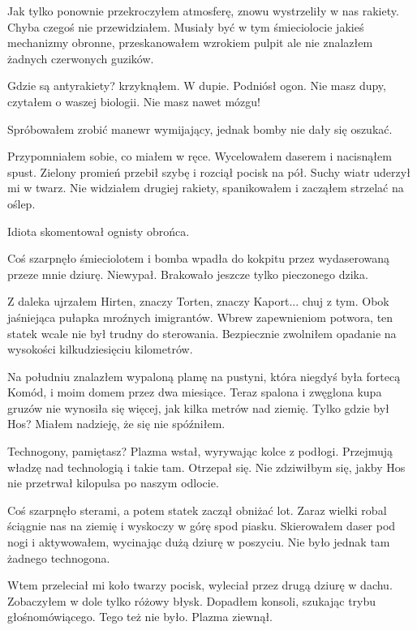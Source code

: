 Jak tylko ponownie przekroczyłem atmosferę, znowu wystrzeliły w nas rakiety.
Chyba czegoś nie przewidziałem.
Musiały być w tym śmieciolocie jakieś mechanizmy obronne, przeskanowałem wzrokiem pulpit ale nie znalazłem żadnych czerwonych guzików.
\begin{dialogue}
\ds{} Gdzie są antyrakiety? \dm{} krzyknąłem.
\ds{} W dupie. \dm{} Podniósł ogon.
\ds{} Nie masz dupy, czytałem o waszej biologii. Nie masz nawet mózgu!
\end{dialogue}
Spróbowałem zrobić manewr wymijający, jednak bomby nie dały się oszukać.

Przypomniałem sobie, co miałem w ręce.
Wycelowałem daserem i nacisnąłem spust.
Zielony promień przebił szybę i rozciął pocisk na pół.
Suchy wiatr uderzył mi w twarz.
Nie widziałem drugiej rakiety, spanikowałem i zacząłem strzelać na oślep.
\begin{dialogue}
\ds{} Idiota \dm{} skomentował ognisty obrońca.
\end{dialogue}

Coś szarpnęło śmieciolotem i bomba wpadła do kokpitu przez wydaserowaną przeze mnie dziurę. Niewypał.
Brakowało jeszcze tylko pieczonego dzika.

Z daleka ujrzałem Hirten, znaczy Torten, znaczy Kaport... chuj z tym.
Obok jaśniejąca pułapka mroźnych imigrantów.
Wbrew zapewnieniom potwora, ten statek wcale nie był trudny do sterowania.
Bezpiecznie zwolniłem opadanie na wysokości kilkudziesięciu kilometrów.

Na południu znalazłem wypaloną plamę na pustyni, która niegdyś była fortecą Komód, i moim domem przez dwa miesiące.
Teraz spalona i zwęglona kupa gruzów nie wynosiła się więcej, jak kilka metrów nad ziemię.
Tylko gdzie był Hos? Miałem nadzieję, że się nie spóźniłem.

\begin{dialogue}
\ds{} Technogony, pamiętasz? \dm{} Plazma wstał, wyrywając kolce z podłogi. \dm{} 
Przejmują władzę nad technologią i takie tam. \dm{} Otrzepał się. \dm{} Nie zdziwiłbym się, jakby Hos nie przetrwał kilopulsa po naszym odlocie.
\end{dialogue}
Coś szarpnęło sterami, a potem statek zaczął obniżać lot.
Zaraz wielki robal ściągnie nas na ziemię i wyskoczy w górę spod piasku.
Skierowałem daser pod nogi i aktywowałem, wycinając dużą dziurę w poszyciu.
Nie było jednak tam żadnego technogona.

Wtem przeleciał mi koło twarzy pocisk, wyleciał przez drugą dziurę w dachu. 
Zobaczyłem w dole tylko różowy błysk.
Dopadłem konsoli, szukając trybu głośnomówiącego.
Tego też nie było.
Plazma ziewnął.

